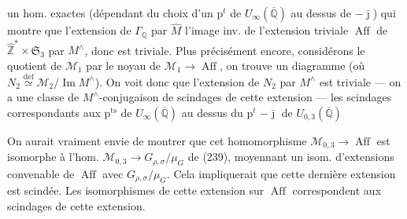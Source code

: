 un hom.  exactes
(dépendant du choix d'un $\mathrm p^{t}$ de $U_\infty(\overline{\mathbb Q})$
au dessus de $-\bar{\jmath}$)
qui montre que l'extension  de
$\Gamma_{\mathbb Q}$ par $\widehat M$
 l'image inv. de l'extension triviale
$\operatorname{Aff}$ de $\widehat{\mathbb Z}^{*}\times\mathfrak S_3$
par $M^\wedge$, donc est triviale.
Plus précisément encore, considérons le quotient 
de $\mathcal M_1$ par le noyau de $\mathcal M_1\longrightarrow\operatorname{Aff}$,
on trouve un diagramme
(où $N_2\overset{\mathrm{def}}{\simeq}\mathcal M_2/\operatorname{Im}M^\wedge$).
On voit donc que l'extension de $N_2$ par $M^\wedge$ est triviale
--- on a une classe de $M^\wedge$-conjugaison de scindages de cette
extension --- les scindages correspondants aux $\mathrm p^{\mathrm{ts}}$ de
$U_\infty(\overline{\mathbb Q})$ au dessus du $\mathrm p^t$
$-\bar{\jmath}$ de $U_{0,3}(\overline{\mathbb Q})$


On aurait vraiment envie de montrer que cet homomorphisme
$\mathcal M_{0,3}\longrightarrow\operatorname{Aff}$ est isomorphe
à l'hom. $\mathcal M_{0,3}\longrightarrow G_{\rho,\sigma}/\mu_G$
de (239), moyennant un isom. d'extensions convenable de
$\operatorname{Aff}$ avec $G_{\rho,\sigma}/\mu_G$.
Cela impliquerait que cette dernière extension est scindée.
Les isomorphismes de cette extension sur $\operatorname{Aff}$
correspondent  aux scindages de cette extension.

